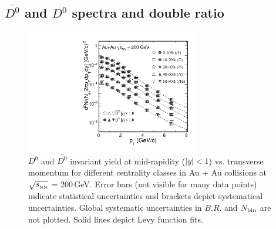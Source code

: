 \subsection{\label{D0barD0ratio} $\bar{D^{0}}$ and $D^{0}$ spectra and double ratio}

\begin{figure}
\centering
\includegraphics[width=0.68\textwidth]{figure/Run14_D0HFT/D0_spectra_bothposneg.pdf}
\caption{$D^{0}$ and $\bar{D^{0}}$ invariant yield at mid-rapidity ($|y|<1$) vs. transverse momentum for different centrality classes in Au + Au collisions at $\sqrt{s_{_{\rm NN}}}$ = 200\,GeV. Error bars (not visible for many data points) indicate statistical uncertainties and brackets depict systematical uncertainties. Global systematic uncertainties in $B.R.$ and $N_{\rm bin}$ are not plotted. Solid lines depict Levy function fits.}
\label{D0_spectra_bothposneg} 
\end{figure}

